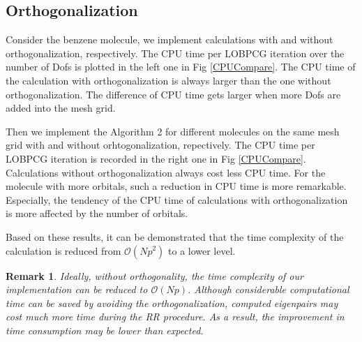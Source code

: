 \documentclass[12pt]{article}
\newtheorem{remark}{Remark} \newtheorem{example}{Example}
\numberwithin{figure}{section}
\numberwithin{table}{section}
\begin{document}
\subsection{Orthogonalization}

 Consider the benzene molecule, we implement calculations with and without orthogonalization, respectively. The CPU time per LOBPCG iteration over the number of Dofs is plotted in the left one in Fig \ref{CPUCompare}. The CPU time of the calculation with orthogonalization is always larger than the one without orthogonalization. The difference of CPU time gets larger when more Dofs are added into the mesh grid. 

Then we implement the Algorithm 2 for different molecules on the same mesh grid with and without orhtogonalization, repectively. The CPU time per LOBPCG iteration is recorded in the right one in Fig \ref{CPUCompare}. Calculations without orthogonalization always cost less CPU time. For the molecule with more orbitals, such a reduction in CPU time is more remarkable. Especially, the tendency of the CPU time of calculations with orthogonalization is more affected by the number of orbitals. 

Based on these results, it can be demonstrated that the time complexity of the calculation is reduced from $\mathcal{O}(Np^2)$ to a lower level. 

\begin{remark}
	Ideally, without orthogonality, the time complexity of our implementation can be reduced to $\mathcal{O}(Np)$. Although considerable computational time can be saved by avoiding the orthogonalization, computed eigenpairs may cost much more time during the RR procedure. As a result, the improvement in time consumption may be lower than expected. 
\end{remark}
\end{document}
